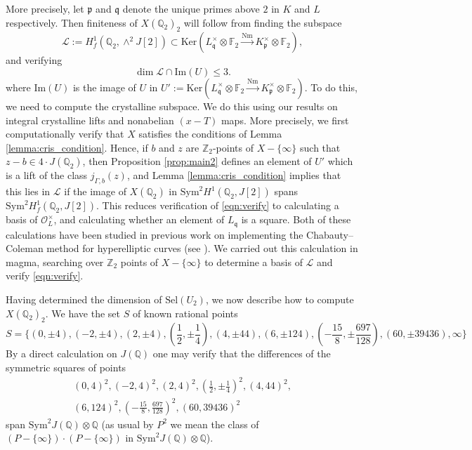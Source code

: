\documentclass[11pt]{amsart}
\def\Z{\mathbb Z}
\def\Q{\mathbb Q}
\def\F{\mathbb F}
\theoremstyle{plain}
\theoremstyle{definition}
\newcommand{\Sym}{\mathrm{Sym}}
\newcommand{\Sel}{\mathrm{Sel}}
\newcommand{\Nm}{\mathrm{Nm}}
\newcommand{\Ker}{\mathrm{Ker}}
\begin{document}
More precisely, let $\mathfrak{p}$ and $\mathfrak{q}$ denote the unique primes above $2$ in $K$ and $L$ respectively. Then finiteness of $X(\Q _2 )_2$ will follow from finding the subspace 
\[
\mathcal{L}:=H^1 _{f}(\Q _2 ,\wedge ^2 J[2])\subset \Ker (L_{\mathfrak{q} }^\times \otimes \F _2 \stackrel{\Nm }{\longrightarrow } K_{\mathfrak{p}}^\times \otimes \F _2 ),
\]
and verifying
\begin{equation}\label{eqn:verify}
\dim \mathcal{L} \cap \mathrm{Im} (U)\leq 3.
\end{equation}
where $\mathrm{Im} (U)$ is the image of $U$ in $U' :=\Ker (L_{\mathfrak{q} }^\times \otimes \F _2 \stackrel{\Nm }{\longrightarrow } K_{\mathfrak{p}}^\times \otimes \F _2 )$. To do this, we need to compute the crystalline subspace. We do this using our results on integral crystalline lifts and nonabelian $(x-T)$ maps. More precisely, we first computationally verify that $X$ satisfies the conditions of Lemma \ref{lemma:cris_condition}. Hence, if $b$ and $z$ are $\Z _2 $-points of $X-\{ \infty \} $ such that $z-b\in 4\cdot J(\Q _2 )$, then Proposition \ref{prop:main2} defines an element of $U'$ which is a lift of the class $j_{\Gamma ,b}(z)$, and Lemma \ref{lemma:cris_condition} implies that this lies in $\mathcal{L}$ if the image of $X(\Q _2 )$ in $\Sym ^2 H^1 (\Q _2 ,J[2])$ spans $\Sym ^2 H^1 _f (\Q _2 ,J[2])$. This reduces verification of \eqref{eqn:verify} to calculating a basis of $\mathcal{O}_L ^\times $, and calculating whether an element of $L_{\mathfrak{q}}$ is a square. Both of these calculations have been studied in previous work on implementing the Chabauty--Coleman method for hyperelliptic curves (see \cite{stoll:implementing}). We carried out this calculation in magma, searching over $\Z _2 $ points of $X-\{ \infty \} $ to determine a basis of $\mathcal{L}$ and verify \eqref{eqn:verify}.

Having determined the dimension of $\Sel (U_2 )$, we now describe how to compute $X(\Q _2 )_2$. We have the set $S$ of known rational points
\begin{equation}\label{eqn:known}
S=\{ (0,\pm 4),(-2,\pm 4), (2,\pm 4),(\frac{1}{2},\pm \frac{1}{4}),(4, \pm 44), (6, \pm 124), (-\frac{15}{8},\pm \frac{697}{128}),(60,\pm 39436),\infty \}
\end{equation}
By a direct calculation on $J(\Q )$ one may verify that the differences of the symmetric squares of points 
\begin{align*}
(0,4)^{2},(-2,4)^{2}, (2,4)^{2},(\frac{1}{2},\pm \frac{1}{4})^{2},(4, 44)^{2}, \\ 
(6, 124)^{2}, (-\frac{15}{8},\frac{697}{128})^{2},(60,39436)^{2}
\end{align*} 
span $\Sym ^2 J(\Q )\otimes \Q $ (as usual by $P^2$ we mean the class of $(P-\{ \infty \} )\cdot (P-\{ \infty \} )$ in $\Sym ^2 J(\Q )\otimes \Q $). 
\end{document}
